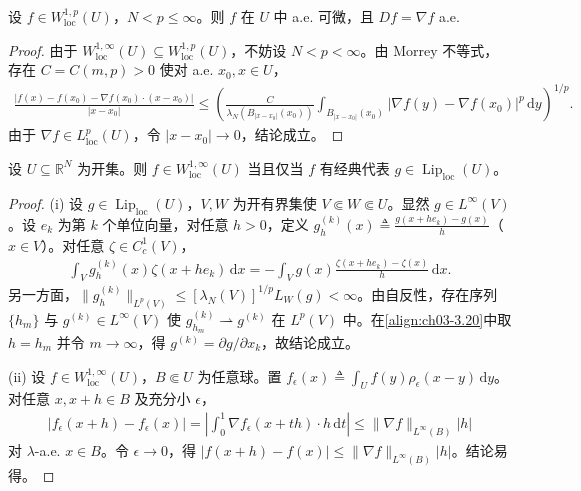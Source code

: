 \documentclass[../../main.tex]{subfiles}%
\begin{document}
\begin{proposition}\label{proposition:ch03-a.e.可微}
设 $f\in W^{1,p}_{\mathrm{loc}}(U)$，$N<p\leqslant\infty$。则 $f$ 在 $U$ 中 a.e. 可微，且 $Df=\nabla f$ a.e.
\end{proposition}

\begin{proof}
由于 $W^{1,\infty}_{\mathrm{loc}}(U)\subseteq W^{1,p}_{\mathrm{loc}}(U)$，不妨设 $N<p<\infty$。由 Morrey 不等式，存在 $C=C(m,p)>0$ 使对 a.e. $x_0,x\in U$，
\begin{align*}
\frac{|f(x)-f(x_0)-\nabla f(x_0)\cdot(x-x_0)|}{|x-x_0|}
\leqslant\left(\frac{C}{\lambda_N(B_{|x-x_0|}(x_0))}\int_{B_{|x-x_0|}(x_0)}|\nabla f(y)-\nabla f(x_0)|^p\,\mathrm{d}y\right)^{1/p}.
\end{align*}
由于 $\nabla f\in L^p_{\mathrm{loc}}(U)$，令 $|x-x_0|\to0$，结论成立。
\end{proof}

\begin{theorem}\label{theorem:ch03-W1infty=Lip}
设 $U\subseteq\mathbb{R}^N$ 为开集。则 $f\in W^{1,\infty}_{\mathrm{loc}}(U)$ 当且仅当 $f$ 有经典代表 $g\in\operatorname{Lip}_{\mathrm{loc}}(U)$。
\end{theorem}

\begin{proof}
(i) 设 $g\in\operatorname{Lip}_{\mathrm{loc}}(U)$，$V,W$ 为开有界集使 $V\Subset W\Subset U$。显然 $g\in L^\infty(V)$。设 $e_k$ 为第 $k$ 个单位向量，对任意 $h>0$，定义 $g_h^{(k)}(x)\triangleq \frac{g(x+he_k)-g(x)}{h}$（$x\in V$）。对任意 $\zeta\in C^1_c(V)$，
\begin{align}
\int_V g_h^{(k)}(x)\zeta(x+he_k)\,\mathrm{d}x
=-\int_V g(x)\frac{\zeta(x+he_k)-\zeta(x)}{h}\,\mathrm{d}x.\label{align:ch03-3.20}
\end{align}
另一方面，$\|g_h^{(k)}\|_{L^p(V)}\leqslant[\lambda_N(V)]^{1/p}L_W(g)<\infty$。由自反性，存在序列 $\{h_m\}$ 与 $g^{(k)}\in L^\infty(V)$ 使 $g_{h_m}^{(k)}\rightharpoonup g^{(k)}$ 在 $L^p(V)$ 中。在\eqref{align:ch03-3.20}中取 $h=h_m$ 并令 $m\to\infty$，得 $g^{(k)}=\partial g/\partial x_k$，故结论成立。

(ii) 设 $f\in W^{1,\infty}_{\mathrm{loc}}(U)$，$B\Subset U$ 为任意球。置 $f_\epsilon(x)\triangleq \int_U f(y)\rho_\epsilon(x-y)\,\mathrm{d}y$。对任意 $x,x+h\in B$ 及充分小 $\epsilon$，
\begin{align*}
|f_\epsilon(x+h)-f_\epsilon(x)|
=\left|\int_0^1\nabla f_\epsilon(x+th)\cdot h\,\mathrm{d}t\right|
\leqslant\|\nabla f\|_{L^\infty(B)}|h|
\end{align*}
对 $\lambda$-a.e. $x\in B$。令 $\epsilon\to0$，得 $|f(x+h)-f(x)|\leqslant\|\nabla f\|_{L^\infty(B)}|h|$。结论易得。
\end{proof}
\end{document}
